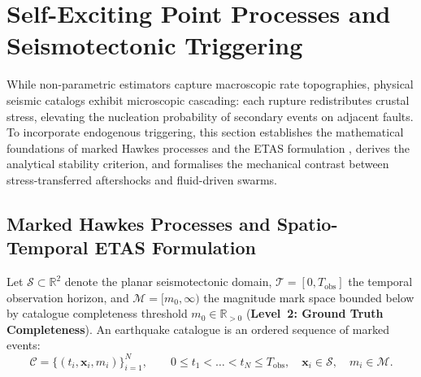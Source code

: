 \section{Self-Exciting Point Processes and Seismotectonic Triggering}
\label{sec:clustering_hawkes_etas}

While non-parametric estimators capture macroscopic rate
topographies, physical seismic catalogs exhibit microscopic
cascading: each rupture redistributes crustal stress, elevating the
nucleation probability of secondary events on adjacent faults. To
incorporate endogenous triggering, this section establishes the
mathematical foundations of marked Hawkes processes
\parencite{hawkes1971} and the \ac{ETAS} formulation
\parencite{ogata1988,ogata1998}, derives the analytical stability
criterion, and formalises the mechanical contrast between
stress-transferred aftershocks and fluid-driven swarms.

\subsection{Marked Hawkes Processes and Spatio-Temporal ETAS Formulation}
\label{subsec:clustering_marked_etas}

Let $\mathcal{S} \subset \mathbb{R}^2$ denote the planar
seismotectonic domain, $\mathcal{T} = [0, T_{\mathrm{obs}}]$ the
temporal observation horizon, and $\mathcal{M} = [m_0, \infty)$ the
magnitude mark space bounded below by catalogue completeness
threshold $m_0 \in \mathbb{R}_{>0}$ (\textbf{Level~2: Ground Truth
Completeness}). An earthquake catalogue is an ordered sequence of
marked events:
\begin{equation}
  \mathcal{C} = \bigl\{ (t_i, \mathbf{x}_i, m_i) \bigr\}_{i=1}^{N},
  \qquad 0 \le t_1 < \dots < t_N \le T_{\mathrm{obs}}, \quad
  \mathbf{x}_i \in \mathcal{S}, \quad m_i \in \mathcal{M}.
  \label{eq:clustering_catalog_def}
\end{equation}


